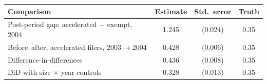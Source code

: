 \begin{tabular}{lccc}\toprule
Comparison & Estimate & Std.\ error & Truth \\ \midrule
Post-period gap: accelerated $-$ exempt, 2004 & 1.245 & (0.024) & 0.35 \\
Before--after, accelerated filers, 2003$\to$2004 & 0.428 & (0.006) & 0.35 \\
Difference-in-differences & 0.436 & (0.008) & 0.35 \\
DiD with size $\times$ year controls & 0.328 & (0.013) & 0.35 \\
\bottomrule\end{tabular}
